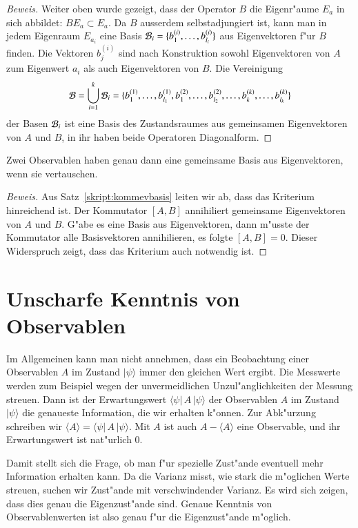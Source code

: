\begin{proof}[Beweis]
Weiter oben wurde gezeigt, dass der Operator $B$ die Eigenr"aume $E_a$ in sich
abbildet: $BE_a\subset E_a$. Da $B$ ausserdem selbstadjungiert ist, kann man
in jedem Eigenraum $E_{a_i}$ eine Basis
${\cal B}_i= \{b_1^{(i)},\dots,b_{l_i}^{(i)}\}$
aus Eigenvektoren f"ur $B$ finden. Die Vektoren $b_j^{(i)}$ sind nach
Konstruktion sowohl Eigenvektoren von $A$ zum Eigenwert $a_i$ als auch
Eigenvektoren von $B$. Die Vereinigung
\[
{\cal B}
=
\bigcup_{i=1}^k{\cal B}_i
=
\{
b_1^{(1)},\dots,b_{l_1}^{(1)},
b_1^{(2)},\dots,b_{l_2}^{(2)},
\dots,
b_k^{(k)},\dots,b_{l_k}^{(k)}
\}
\]
der Basen ${\cal B}_i$ ist eine Basis des Zustandsraumes aus gemeinsamen
Eigenvektoren von $A$ und $B$, in ihr haben beide Operatoren Diagonalform.
\end{proof}

\begin{satz}
Zwei Observablen haben genau dann eine gemeinsame Basis aus Eigenvektoren,
wenn sie vertauschen.
\end{satz}

\begin{proof}[Beweis]
Aus Satz~\ref{skript:kommevbasis} leiten wir ab, dass das Kriterium
hinreichend ist.
Der Kommutator $[A,B]$ annihiliert gemeinsame Eigenvektoren von $A$
und $B$.
G"abe es eine Basis aus Eigenvektoren, dann m"usste der Kommutator alle
Basisvektoren annihilieren, es folgte $[A,B]=0$. Dieser
Widerspruch zeigt, dass das Kriterium auch notwendig ist.
\end{proof}


\section{Unscharfe Kenntnis von Observablen}
Im Allgemeinen kann man nicht annehmen, dass ein Beobachtung einer
Observablen $A$ im Zustand $|\psi\rangle$ immer den gleichen Wert ergibt.
Die Messwerte werden zum Beispiel wegen der unvermeidlichen
Unzul"anglichkeiten der Messung streuen.
Dann ist der Erwartungswert $\langle \psi|\,A\,|\psi\rangle$
der Observablen $A$ im Zustand $|\psi\rangle$ die genaueste Information,
die wir erhalten k"onnen.
Zur Abk"urzung schreiben wir $\langle A\rangle=\langle\psi|\,A\,|\psi\rangle$.
Mit $A$ ist auch $A-\langle A\rangle$ eine Observable, und ihr Erwartungswert
ist nat"urlich $0$.

Damit stellt sich die Frage, ob man f"ur spezielle Zust"ande eventuell
mehr Information erhalten kann.
Da die Varianz misst, wie stark die m"oglichen Werte streuen, suchen
wir Zust"ande mit verschwindender Varianz.
Es wird sich zeigen, dass dies genau die Eigenzust"ande sind.
Genaue Kenntnis von Observablenwerten ist also genau f"ur die
Eigenzust"ande m"oglich.

